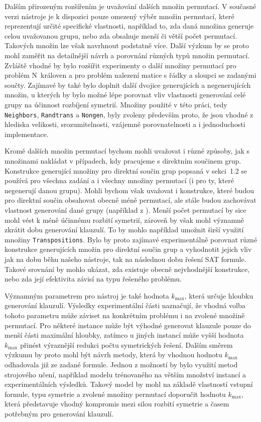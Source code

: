 Dalším přirozeným rozšířením je uvažování dalších množin permutací. V současné verzi nástroje je k dispozici pouze omezený výběr množin permutací,
které reprezentují určité specifické vlastnosti, například to, zda daná množina generuje celou uvažovanou grupu, nebo zda obsahuje menší či větší počet permutací. Takových množin lze však navrhnout podstatně více. Další výzkum by se proto mohl zaměřit na detailnější návrh a porovnání různých typů množin permutací. Zvláště vhodné by bylo rozšířit experimenty o další množiny permutací pro problém N královen a pro problém nalezení matice s řádky a sloupci se zadanými součty. Zajímavé by také bylo doplnit další dvojice generujících a negenerujících množin, u kterých by bylo možné lépe porovnat vliv vlastnosti generování celé grupy na účinnost rozbíjení symetrií. Množiny použité v této práci, tedy \texttt{Neighbors}, \texttt{Randtrans} a \texttt{Nongen}, byly zvoleny především proto, že jsou vhodné z hlediska velikosti, srozumitelnosti, vzájemné porovnatelnosti a i jednoduchosti implementace.

Kromě dalších množin permutací bychom mohli uvažovat i různé způsoby, jak s množinami nakládat v případech, kdy pracujeme s direktním součinem grup. Konstrukce generující množiny pro direktní součin grup popsaná v sekci 1.2 se používá pro všechna zadání a i všechny množiny permutací (i pro ty, které negenerují danou grupu). Mohli bychom však uvažovat i konstrukce, které budou pro direktní součin obsahovat obecně méně permutací, ale stále budou zachovávat vlastnost generování dané grupy (například z \cite{Magnus2004}). Menší počet permutací by sice mohl vést k méně účinnému rozbití symetrií, zároveň by však mohl významně zkrátit dobu generování klauzulí. To by mohlo například umožnit širší využití množiny \texttt{Transpositions}. Bylo by proto zajímavé experimentálně porovnat různé konstrukce generujících množin pro direktní součin grup a vyhodnotit jejich vliv jak na dobu běhu našeho nástroje, tak na následnou dobu řešení SAT formule. Takové srovnání by mohlo ukázat, zda existuje obecně nejvhodnější konstrukce, nebo zda její efektivita závisí na typu řešeného problému.

Významným parametrem pro nástroj je také hodnota $k_{\max}$, která určuje hloubku generování klauzulí. Výsledky experimentální části naznačují, že vhodná volba
tohoto parametru může záviset na konkrétním problému i na zvolené množině permutací. Pro některé instance může být výhodné generovat klauzule pouze do
menší části maximální hloubky, zatímco u jiných instancí může vyšší hodnota $k_{\max}$ přinést výraznější redukci počtu symetrických řešení. Dalším směrem
výzkumu by proto mohl být návrh metody, která by vhodnou hodnotu $k_{\max}$ odhadovala již ze zadané formule. Jednou z možností by bylo využití metod
strojového učení, například modelu trénovaného na větším množství instancí a experimentálních výsledků. Takový model by mohl na základě vlastností vstupní
formule, typu symetrie a zvolené množiny permutací doporučit hodnotu $k_{\max}$, která představuje vhodný kompromis mezi silou rozbití symetrie a časem potřebným pro generování klauzulí.

